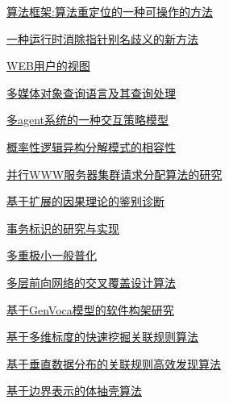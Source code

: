 \documentclass[a4paper]{article}
\begin{document}
\href{http://www.jos.org.cn/ch/reader/download_pdf.aspx?file_no=19990702&year_id=1999&quarter_id=7&falg=1}{算法框架:算法重定位的一种可操作的方法}

\href{http://www.jos.org.cn/ch/reader/download_pdf.aspx?file_no=19990703&year_id=1999&quarter_id=7&falg=1}{一种运行时消除指针别名歧义的新方法}

\href{http://www.jos.org.cn/ch/reader/download_pdf.aspx?file_no=19990704&year_id=1999&quarter_id=7&falg=1}{WEB用户的视图}

\href{http://www.jos.org.cn/ch/reader/download_pdf.aspx?file_no=19990705&year_id=1999&quarter_id=7&falg=1}{多媒体对象查询语言及其查询处理}

\href{http://www.jos.org.cn/ch/reader/download_pdf.aspx?file_no=19990706&year_id=1999&quarter_id=7&falg=1}{多agent系统的一种交互策略模型}

\href{http://www.jos.org.cn/ch/reader/download_pdf.aspx?file_no=19990707&year_id=1999&quarter_id=7&falg=1}{概率性逻辑异构分解模式的相容性}

\href{http://www.jos.org.cn/ch/reader/download_pdf.aspx?file_no=19990708&year_id=1999&quarter_id=7&falg=1}{并行WWW服务器集群请求分配算法的研究}

\href{http://www.jos.org.cn/ch/reader/download_pdf.aspx?file_no=19990709&year_id=1999&quarter_id=7&falg=1}{基于扩展的因果理论的鉴别诊断}

\href{http://www.jos.org.cn/ch/reader/download_pdf.aspx?file_no=19990710&year_id=1999&quarter_id=7&falg=1}{事务标识的研究与实现}

\href{http://www.jos.org.cn/ch/reader/download_pdf.aspx?file_no=19990711&year_id=1999&quarter_id=7&falg=1}{多重极小一般普化}

\href{http://www.jos.org.cn/ch/reader/download_pdf.aspx?file_no=19990712&year_id=1999&quarter_id=7&falg=1}{多层前向网络的交叉覆盖设计算法}

\href{http://www.jos.org.cn/ch/reader/download_pdf.aspx?file_no=19990713&year_id=1999&quarter_id=7&falg=1}{基于GenVoca模型的软件构架研究}

\href{http://www.jos.org.cn/ch/reader/download_pdf.aspx?file_no=19990714&year_id=1999&quarter_id=7&falg=1}{基于多维标度的快速挖掘关联规则算法}

\href{http://www.jos.org.cn/ch/reader/download_pdf.aspx?file_no=19990715&year_id=1999&quarter_id=7&falg=1}{基于垂直数据分布的关联规则高效发现算法}

\href{http://www.jos.org.cn/ch/reader/download_pdf.aspx?file_no=19990716&year_id=1999&quarter_id=7&falg=1}{基于边界表示的体抽壳算法}
\end{document}
